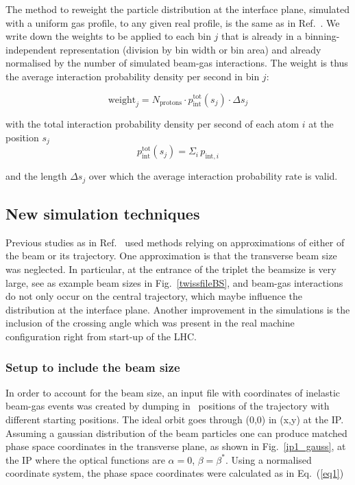 The method to reweight the particle distribution at the interface plane, simulated with a uniform gas profile, to any given real profile, is the same as in Ref.~\cite{nimPaperRod}. We write down the weights to be applied to each bin $j$ that is already in a binning-independent representation (division by bin width or bin area) and already normalised by the number of simulated beam-gas interactions. The weight is thus the average interaction probability density per second in bin $j$:

\begin{equation} \label{eq3}
\mathrm{weight}_j = N_{\mathrm{protons}} \cdot p_{\mathrm{int}}^{\mathrm{tot}} (s_j) \cdot \Delta s_{j} 
\end{equation}

with the total interaction probability density per second of each atom $i$ at the position $s_j$ 
\begin{equation*} 
  p_{\mathrm{int}}^{\mathrm{tot}} (s_j) = \Sigma_i \, p_{\textrm{int},i}
\end{equation*}

and the length $\Delta s_{j}$ over which the average interaction probability rate is valid.

\subsection{New simulation techniques}
Previous studies as in Ref.~\cite{nimPaperRod} used methods relying on approximations of either of the beam or its trajectory. One approximation is that the transverse beam size was neglected. In particular, at the entrance of the triplet the beamsize is very large, see as example beam sizes in Fig.~\ref{twissfileBS}, and beam-gas interactions do not only occur on the central trajectory, which maybe influence the distribution at the interface plane. Another improvement in the simulations is the inclusion of the crossing angle which was present in the real machine configuration right from start-up of the LHC.

\subsubsection{Setup to include the beam size}

In order to account for the beam size, an input file with coordinates of inelastic beam-gas events was created by dumping in \fluka~positions of the trajectory with different starting positions. The ideal orbit goes through (0,0) in (x,y) at the IP. Assuming a gaussian distribution of the beam particles one can produce matched phase space coordinates in the transverse plane, as shown in Fig.~\ref{ip1_gauss}, at the IP where the optical functions are $\alpha=0$, $\beta=\beta^*$. Using a normalised coordinate system, the phase space coordinates were calculated as in Eq.~(\ref{eq1})

